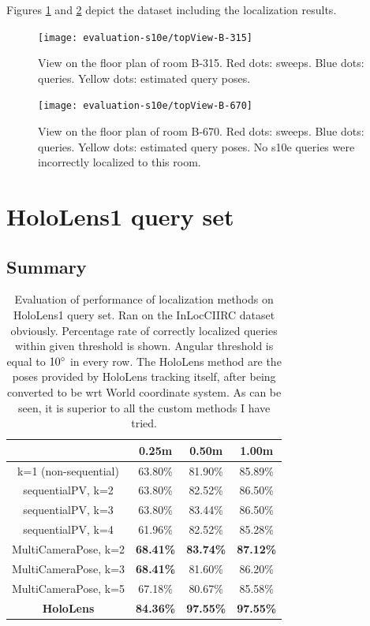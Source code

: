 \documentclass[twoside]{ctuthesis}
\theoremstyle{plain}
\theoremstyle{definition}
\theoremstyle{note}
\begin{document}
Figures \ref{fig:topView-B-315} and \ref{fig:topView-B-670} depict the dataset including the localization results.

\begin{figure}[htb!]
	\centering
 	\texttt{[image: evaluation-s10e/topView-B-315]}
 	\caption{View on the floor plan of room B-315. Red dots: sweeps. Blue dots: queries. Yellow dots: estimated query poses.}
 	\label{fig:topView-B-315}
\end{figure} 

\begin{figure}[htb!]
	\centering
 	\texttt{[image: evaluation-s10e/topView-B-670]}
 	\caption{View on the floor plan of room B-670. Red dots: sweeps. Blue dots: queries. Yellow dots: estimated query poses. No s10e queries were incorrectly localized to this room.}
 	\label{fig:topView-B-670}
\end{figure} 

\section{HoloLens1 query set}

\subsection{Summary}

\begin{table}[htb!]
	\centering
	\begin{tabular}{|c|c|c|c|}
		\hline
		\diagbox{\small Method}{\small Threshold} & 0.25m & 0.50m & 1.00m \\
		\hline
		k=1 (non-sequential) & 63.80\% & 81.90\% & 85.89\% \\
		\hline
		sequentialPV, k=2 & 63.80\% & 82.52\% & 86.50\% \\
		\hline
		sequentialPV, k=3 & 63.80\% & 83.44\% & 86.50\% \\
		\hline
		sequentialPV, k=4 & 61.96\% & 82.52\% & 85.28\% \\
		\hline
		MultiCameraPose, k=2 & \bfseries 68.41\% & \bfseries 83.74\% & \bfseries 87.12\% \\
		\hline
		MultiCameraPose, k=3 & \bfseries 68.41\% & 81.60\% & 86.20\% \\
		\hline
		MultiCameraPose, k=5 & 67.18\% & 80.67\% & 85.58\% \\
		\hline
		\bfseries HoloLens & \bfseries 84.36\% & \bfseries 97.55\% & \bfseries 97.55\% \\
		\hline
	\end{tabular}
	\caption{Evaluation of performance of localization methods on HoloLens1 query set. Ran on the InLocCIIRC dataset obviously. Percentage rate of correctly localized queries within given threshold is shown. Angular threshold is equal to $10\degree$ in every row. The HoloLens method are the poses provided by HoloLens tracking itself, after being converted to be wrt World coordinate system. As can be seen, it is superior to all the custom methods I have tried.}
	\label{tab:HL1-InLoc-statistics}
\end{table}
\end{document}

